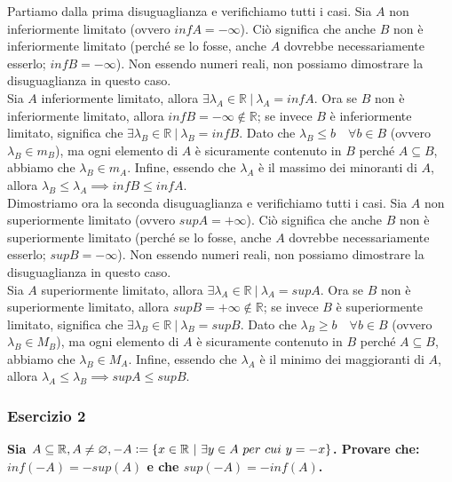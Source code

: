 \documentclass{article}
\begin{document}
\noindent Partiamo dalla prima disuguaglianza e verifichiamo tutti i casi. Sia $A$ non inferiormente limitato (ovvero $infA = - \infty$). Ciò significa che anche $B$ non è inferiormente limitato (perché se lo fosse, anche $A$ dovrebbe necessariamente esserlo; $infB = - \infty$). Non essendo numeri reali, non possiamo dimostrare la disuguaglianza in questo caso.\\
\noindent Sia $A$ inferiormente limitato, allora $\exists \lambda_A \in \mathbb{R} \ | \ \lambda_A = infA$. Ora se $B$ non è inferiormente limitato, allora $infB = - \infty \notin \mathbb{R}$; se invece $B$ è inferiormente limitato, significa che $\exists \lambda_B \in \mathbb{R} \ | \ \lambda_B = infB$. Dato che $\lambda_B \leq b \quad \forall b \in B$ (ovvero $\lambda_B \in m_B$), ma ogni elemento di $A$ è sicuramente contenuto in $B$ perché $A \subseteq B$, abbiamo che $\lambda_B \in m_A$. Infine, essendo che $\lambda_A$ è il massimo dei minoranti di $A$, allora $\lambda_B \leq \lambda_A \implies infB \leq infA$. \\

\noindent Dimostriamo ora la seconda disuguaglianza e verifichiamo tutti i casi. Sia $A$ non superiormente limitato (ovvero $supA = + \infty$). Ciò significa che anche $B$ non è superiormente limitato (perché se lo fosse, anche $A$ dovrebbe necessariamente esserlo; $supB = - \infty$). Non essendo numeri reali, non possiamo dimostrare la disuguaglianza in questo caso. \\
\noindent Sia $A$ superiormente limitato, allora $\exists \lambda_A \in \mathbb{R} \ | \ \lambda_A = supA$. Ora se $B$ non è superiormente limitato, allora $supB = + \infty \notin \mathbb{R}$; se invece $B$ è superiormente limitato, significa che $\exists \lambda_B \in \mathbb{R} \ | \ \lambda_B = supB$. Dato che $\lambda_B \geq b \quad \forall b \in B$ (ovvero $\lambda_B \in M_B$), ma ogni elemento di $A$ è sicuramente contenuto in $B$ perché $A \subseteq B$, abbiamo che $\lambda_B \in M_A$. Infine, essendo che $\lambda_A$ è il minimo dei maggioranti di $A$, allora $\lambda_A \leq \lambda_B \implies supA \leq supB$.

\subsubsection{Esercizio 2}
\textbf{Sia $A \subseteq \mathbb{R}, A \neq \varnothing, -A \vcentcolon = \{ x \in \mathbb{R} \ | \ \exists y \in A \ per \ cui \ y = -x\}$. Provare che: $inf(-A) = -sup(A)$ e che $sup(-A) = -inf(A)$.} \\
\end{document}
